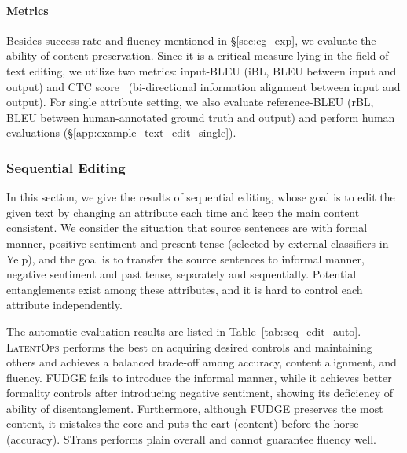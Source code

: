 \documentclass[11pt]{article}
\begin{document}
\paragraph{Metrics}
Besides success rate and fluency mentioned in \S\ref{sec:cg_exp}, we evaluate the ability of content preservation. Since it is a critical measure lying in the field of text editing,
we utilize two metrics: input-BLEU (iBL, BLEU between input and output)
and CTC score~\cite{ctc_score} (bi-directional information alignment between input and output).
For single attribute setting, we also evaluate reference-BLEU (rBL, BLEU between human-annotated ground truth and output) and perform human evaluations (\S\ref{app:example_text_edit_single}). 


\subsubsection{Sequential Editing}
\label{sec:sequential_edit}
In this section, we give the results of sequential editing, whose goal is to edit the given text by changing an attribute each time and keep the main content consistent. We consider the situation that source sentences are with formal manner, positive sentiment and present tense (selected by external classifiers in Yelp), and the goal is to transfer the source sentences to informal manner, negative sentiment and past tense, separately and sequentially. Potential entanglements exist among these attributes, and it is hard to control each attribute independently.

 The automatic evaluation results are listed in Table~\ref{tab:seq_edit_auto}. 
\textsc{LatentOps} performs the best on acquiring desired controls and maintaining others and achieves a balanced trade-off among accuracy, content alignment, and fluency. 
FUDGE fails to introduce the informal manner, while it achieves better formality controls after introducing negative sentiment, showing its deficiency of ability of disentanglement. Furthermore, although FUDGE preserves the most content, it mistakes the core and puts the cart (content) before the horse (accuracy). STrans performs plain overall and cannot guarantee fluency well. 
\end{document}
